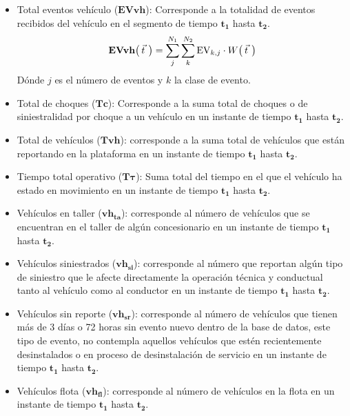 \begin{itemize}
    \item Total eventos vehículo ($\mathbf{EVvh}$): Corresponde a la totalidad de eventos recibidos del vehículo en el segmento de tiempo $\mathbf{t_1}$ hasta $\mathbf{t_2}$.
    \begin{equation*}
        \mathbf{EVvh}\big( \hspace{0.07cm} \smash{\vec{t}}\,\vphantom{t} \hspace{0.07cm} \big) = \sum_j^{N_1} \sum_k^{N_2} \text{EV}_{k,j} \cdot W \big( \hspace{0.07cm} \smash{\vec{t}}\,\vphantom{t} \hspace{0.07cm} \big) 
    \end{equation*}
    Dónde $j$ es el número de eventos y $k$ la clase de evento.
    \item Total de choques ($\mathbf{Tc}$): Corresponde a la suma total de choques o de siniestralidad por choque a un vehículo en un instante de tiempo  $\mathbf{t_1}$ hasta $\mathbf{t_2}$.
    \item Total de vehículos ($\mathbf{Tvh}$): corresponde a la suma total de vehículos que están reportando en la plataforma en un instante de tiempo $\mathbf{t_1}$ hasta $\mathbf{t_2}$.
    \item Tiempo total operativo ($\mathbf{T\tau}$): Suma total del tiempo en el que el vehículo ha estado en movimiento en un instante de tiempo $\mathbf{t_1}$ hasta $\mathbf{t_2}$.
    \item Vehículos en taller ($\mathbf{vh_{ta}}$): corresponde al número de vehículos que se encuentran en el taller de algún concesionario en un instante de tiempo $\mathbf{t_1}$ hasta $\mathbf{t_2}$.
    \item Vehículos siniestrados ($\mathbf{vh_{si}}$): corresponde al número que reportan algún tipo de siniestro que le afecte directamente la operación técnica y conductual tanto al vehículo como al conductor en un instante de tiempo $\mathbf{t_1}$ hasta $\mathbf{t_2}$.
    \item Vehículos sin reporte ($\mathbf{vh_{sr}}$): corresponde al número de vehículos que tienen más de 3 días o 72 horas sin evento nuevo dentro de la base de datos, este tipo de evento, no contempla aquellos vehículos que estén recientemente desinstalados o en proceso de desinstalación de servicio en un instante de tiempo $\mathbf{t_1}$ hasta $\mathbf{t_2}$.
    \item Vehículos flota ($\mathbf{vh_{fl}}$): corresponde al número de vehículos en la flota en un instante de tiempo $\mathbf{t_1}$ hasta $\mathbf{t_2}$.
\end{itemize}

